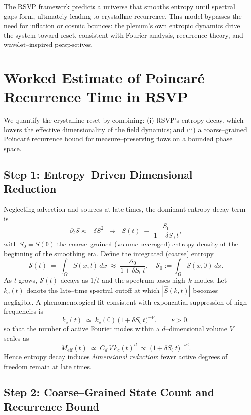 \documentclass[a4paper,11pt,openany]{book}
\begin{document}
The RSVP framework predicts a universe that smooths entropy until spectral gaps form,
ultimately leading to crystalline recurrence. This model bypasses the need for inflation 
or cosmic bounces: the plenum’s own entropic dynamics drive the system toward reset, 
consistent with Fourier analysis, recurrence theory, and wavelet–inspired perspectives.


\section{Worked Estimate of Poincaré Recurrence Time in RSVP}

We quantify the crystalline reset by combining: (i) RSVP’s entropy decay, which lowers the
effective dimensionality of the field dynamics; and (ii) a coarse–grained Poincaré
recurrence bound for measure–preserving flows on a bounded phase space.

\subsection{Step 1: Entropy–Driven Dimensional Reduction}

Neglecting advection and sources at late times, the dominant entropy decay term is
\[
\partial_t S \approx -\delta S^2
\;\;\Rightarrow\;\;
S(t) \;=\; \frac{S_0}{1+\delta S_0\,t},
\]
with $S_0 = S(0)$ the coarse–grained (volume–averaged) entropy density at the beginning of
the smoothing era. Define the integrated (coarse) entropy
\[
\mathcal{S}(t) \;=\; \int_\Omega S(x,t)\,dx 
\;\approx\; \frac{\mathcal{S}_0}{1+\delta S_0\,t}, 
\quad \mathcal{S}_0 := \int_\Omega S(x,0)\,dx.
\]
As $t$ grows, $\mathcal{S}(t)$ decays as $1/t$ and the spectrum loses high–$k$ modes. Let
$k_c(t)$ denote the late–time spectral cutoff at which $|\hat S(k,t)|$ becomes negligible. A
phenomenological fit consistent with exponential suppression of high frequencies is
\[
k_c(t) \;\simeq\; k_c(0)\,\Big(1+\delta S_0\,t\Big)^{-\nu}, 
\qquad \nu>0,
\]
so that the number of active Fourier modes within a $d$–dimensional volume $V$ scales as
\[
M_{\text{eff}}(t) \;\simeq\; C_d\,V\,k_c(t)^d 
\;\propto\; \Big(1+\delta S_0\,t\Big)^{-\nu d}.
\]
Hence entropy decay induces \emph{dimensional reduction}: fewer active degrees of freedom
remain at late times.

\subsection{Step 2: Coarse–Grained State Count and Recurrence Bound}
\end{document}
